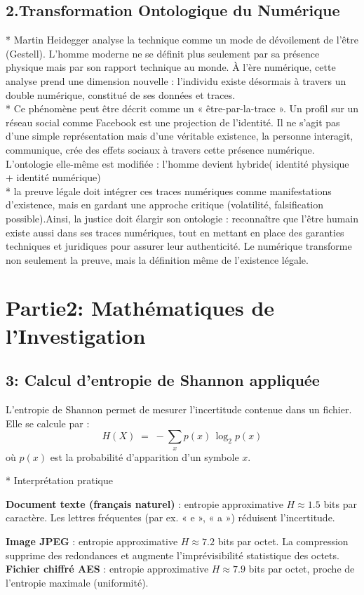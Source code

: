 \documentclass[12pt,a4paper]{article}
\begin{document}
	 \subsection*{2.Transformation Ontologique du Numérique }
	 * Martin Heidegger analyse la technique comme un mode de dévoilement de l’être (Gestell). L’homme moderne ne se définit plus seulement par sa présence physique mais par son rapport technique au monde. À l’ère numérique, cette analyse prend une dimension nouvelle : l’individu existe désormais à travers un double numérique, constitué de ses données et traces.\\[0.5cm]
	 * Ce phénomène peut être décrit comme un « être-par-la-trace ». Un profil sur un réseau social comme Facebook est une projection de l’identité. Il ne s’agit pas d’une simple représentation mais d’une véritable existence, la personne interagit, communique, crée des effets sociaux à travers cette présence numérique. L’ontologie elle-même est modifiée : l’homme devient hybride( identité physique + identité numérique)\\[0.5cm]
	 * la preuve légale doit intégrer ces traces numériques comme manifestations d’existence, mais en gardant une approche critique (volatilité, falsification possible).Ainsi, la justice doit élargir son ontologie : reconnaître que l’être humain existe aussi dans ses traces numériques, tout en mettant en place des garanties techniques et juridiques pour assurer leur authenticité. Le numérique transforme non seulement la preuve, mais la définition même de l’existence légale.
	 \section*{Partie2: Mathématiques de l’Investigation}
	 \subsection*{3: Calcul d'entropie de Shannon appliquée}
	 
	 L'entropie de Shannon permet de mesurer l'incertitude contenue dans un fichier. Elle se calcule par :
	 \[
	 H(X) \;=\; - \sum_{x} p(x)\,\log_2 p(x)
	 \]
	 où \(p(x)\) est la probabilité d'apparition d'un symbole \(x\).
	 
	 * Interprétation pratique
	 \begin{itemize}
	 	 \textbf{Document texte (français naturel)} : entropie approximative \(H \approx 1{.}5\) bits par caractère. Les lettres fréquentes (par ex. « e », « a ») réduisent l'incertitude.
	 	 
	 	 \textbf{Image JPEG} : entropie approximative \(H \approx 7{.}2\) bits par octet. La compression supprime des redondances et augmente l'imprévisibilité statistique des octets.
	 	\textbf{Fichier chiffré AES} : entropie approximative \(H \approx 7{.}9\) bits par octet, proche de l'entropie maximale (uniformité).
	 	
	 \end{itemize}
	 
\end{document}
